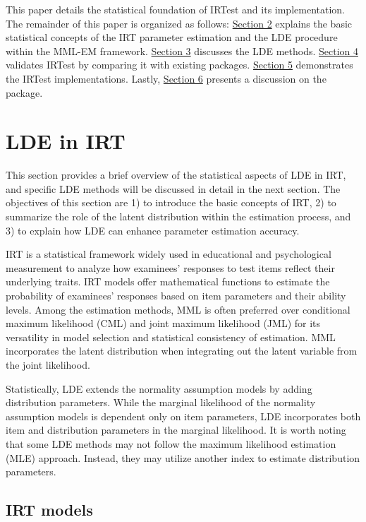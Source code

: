 This paper details the statistical foundation of IRTest and its
implementation. The remainder of this paper is organized as follows:
\protect\hyperlink{lde-in-irt}{Section 2} explains the basic statistical concepts of the
IRT parameter estimation and the LDE procedure within the MML-EM
framework. \protect\hyperlink{lde-methods}{Section 3} discusses the LDE methods. \protect\hyperlink{package-validation}{Section
4} validates IRTest by comparing it with existing
packages. \protect\hyperlink{implementations-of-the-irtest}{Section 5} demonstrates the
IRTest implementations. Lastly, \protect\hyperlink{discussion}{Section 6} presents a
discussion on the package.

\hypertarget{lde-in-irt}{%
\section{LDE in IRT}\label{lde-in-irt}}

This section provides a brief overview of the statistical aspects of LDE
in IRT, and specific LDE methods will be discussed in detail in the next
section. The objectives of this section are 1) to introduce the basic
concepts of IRT, 2) to summarize the role of the latent distribution
within the estimation process, and 3) to explain how LDE can enhance
parameter estimation accuracy.

IRT is a statistical framework widely used in educational and
psychological measurement to analyze how examinees' responses to test
items reflect their underlying traits. IRT models offer mathematical
functions to estimate the probability of examinees' responses based on
item parameters and their ability levels. Among the estimation methods,
MML is often preferred over conditional maximum likelihood (CML) and
joint maximum likelihood (JML) for its versatility in model selection
and statistical consistency of estimation. MML incorporates the latent
distribution when integrating out the latent variable from the joint
likelihood.

Statistically, LDE extends the normality assumption models by adding
distribution parameters. While the marginal likelihood of the normality
assumption models is dependent only on item parameters, LDE incorporates
both item and distribution parameters in the marginal likelihood. It is
worth noting that some LDE methods may not follow the maximum likelihood
estimation (MLE) approach. Instead, they may utilize another index to
estimate distribution parameters.

\hypertarget{irt-models}{%
\subsection{IRT models}\label{irt-models}}

